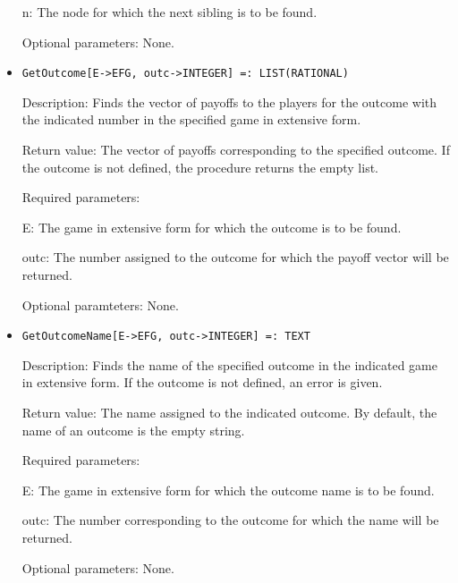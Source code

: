 \begin{itemize}
\bd
\item
[n:] The node for which the next sibling is to be found.
\ed

\item
[Optional parameters:] None.
\ed

\item
\protect \large \begin{verbatim}
GetOutcome[E->EFG, outc->INTEGER] =: LIST(RATIONAL)
\end{verbatim}\normalsize

\bd
\item
[Description:] Finds the vector of payoffs to the players for the
outcome with the indicated number in the specified game in
extensive form.
\item
[Return value:] The vector of payoffs corresponding to the specified
outcome.  If the outcome is not defined, the procedure returns the
empty list.
\item
[Required parameters:]\hfil\null

\bd
\item
[E:] The game in extensive form for which the outcome is to be
found.
\item
[outc:] The number assigned to the outcome for which the payoff vector
will be returned.
\ed

\item
[Optional paramteters:] None.
\ed

\item
\protect \large \begin{verbatim}
GetOutcomeName[E->EFG, outc->INTEGER] =: TEXT
\end{verbatim}\normalsize

\bd

\item
[Description:] Finds the name of the specified outcome in the
indicated game in extensive form.  If the outcome is not defined,
an error is given.
\item
[Return value:] The name assigned to the indicated outcome.  By
default, the name of an outcome is the empty string.
\item
[Required parameters:]\hfil\null

\bd
\item	  
[E:] The game in extensive form for which the outcome name is to be
found.
\item
[outc:] The number corresponding to the outcome for which the name
will be returned.
\ed

\item
[Optional parameters:] None.
\ed


\end{itemize}
